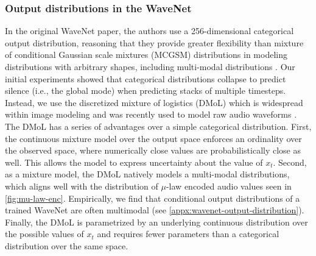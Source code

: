 

\subsubsection{Output distributions in the WaveNet}
In the original WaveNet paper, the authors use a 256-dimensional categorical output distribution, reasoning that they provide greater flexibility than mixture of conditional Gaussian scale mixtures (MCGSM) distributions in modeling distributions with arbitrary shapes, including multi-modal distributions
\cite{oord_pixel_2016,oord_wavenet_2016}.
Our initial experiments showed that categorical distributions collapse to predict silence (i.e., the global mode) when predicting stacks of multiple timesteps. 
Instead, we use the discretized mixture of logistics (DMoL) which is widespread within image modeling and was recently used to model raw audio waveforms \cite{salimans_pixelcnn_2017, oord_parallel_2017}.
The DMoL has a series of advantages over a simple categorical distribution. 
First, the continuous mixture model over the output space enforces an ordinality over the observed space, where numerically close values are probabilistically close as well.
This allows the model to express uncertainty about the value of $x_t$.
Second, as a mixture model, the DMoL natively models a multi-modal distributions, which aligns well with the distribution of $\mu$-law encoded audio values seen in \cref{fig:mu-law-enc}. 
Empirically, we find that conditional output distributions of a trained WaveNet are often multimodal (see \cref{appx:wavenet-output-distribution}).
Finally, the DMoL is parametrized by an underlying continuous distribution over the possible values of $x_t$ and requires fewer parameters than a categorical distribution over the same space.





